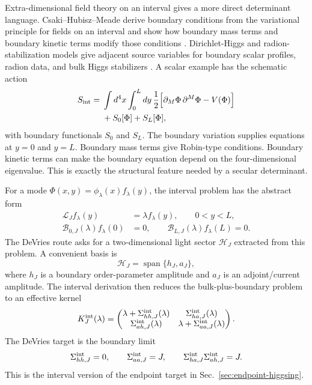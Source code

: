 Extra-dimensional field theory on an interval gives a more direct determinant language.  Csaki--Hubisz--Meade derive boundary conditions from the variational principle for fields on an interval and show how boundary mass terms and boundary kinetic terms modify those conditions \cite{CsakiHubiszMeade2005}.  Dirichlet-Higgs and radion-stabilization models give adjacent source variables for boundary scalar profiles, radion data, and bulk Higgs stabilizers \cite{Bucci2004,HabaOda2011}.  A scalar example has the schematic action
\begin{equation}
  \begin{aligned}
  S_{\rm int}
  ={}&
  \int d^4x\int_0^Ldy\,
  \frac12\Big[
  \partial_M\Phi\,\partial^M\Phi
  -V(\Phi)
  \Big]
  \\
  &+S_0[\Phi]+S_L[\Phi],
  \end{aligned}
  \label{eq:interval-action}
\end{equation}
with boundary functionals \(S_0\) and \(S_L\).  The boundary variation supplies equations at \(y=0\) and \(y=L\).  Boundary mass terms give Robin-type conditions.  Boundary kinetic terms can make the boundary equation depend on the four-dimensional eigenvalue.  This is exactly the structural feature needed by a secular determinant.

For a mode \(\Phi(x,y)=\phi_\lambda(x)f_\lambda(y)\), the interval problem has the abstract form
\begin{align}
  \mathcal L_J f_\lambda(y)&=\lambda f_\lambda(y),
  \qquad 0<y<L,
  \label{eq:interval-bulk-eigenproblem}\\
  \mathcal B_{0,J}(\lambda)f_\lambda(0)&=0,
  \qquad
  \mathcal B_{L,J}(\lambda)f_\lambda(L)=0.
  \label{eq:interval-boundary-eigenproblem}
\end{align}
The DeVries route asks for a two-dimensional light sector \(\mathcal H_J\) extracted from this problem.  A convenient basis is
\begin{equation}
  \mathcal H_J=\operatorname{span}\{h_J,a_J\},
  \label{eq:interval-light-sector}
\end{equation}
where \(h_J\) is a boundary order-parameter amplitude and \(a_J\) is an adjoint/current amplitude.  The interval derivation then reduces the bulk-plus-boundary problem to an effective kernel
\begin{equation}
  K_J^{\rm int}(\lambda)=
  \begin{pmatrix}
    \lambda+\Sigma_{hh,J}^{\rm int}(\lambda)
    &
    \Sigma_{ha,J}^{\rm int}(\lambda)
    \\
    \Sigma_{ah,J}^{\rm int}(\lambda)
    &
    \lambda+\Sigma_{aa,J}^{\rm int}(\lambda)
  \end{pmatrix}.
  \label{eq:interval-effective-kernel}
\end{equation}
The DeVries target is the boundary limit
\begin{equation}
  \Sigma_{hh,J}^{\rm int}=0,\qquad
  \Sigma_{aa,J}^{\rm int}=J,\qquad
  \Sigma_{ha,J}^{\rm int}\Sigma_{ah,J}^{\rm int}=J.
  \label{eq:interval-self-energy-target}
\end{equation}
This is the interval version of the endpoint target in Sec.~\ref{sec:endpoint-higgsing}.

